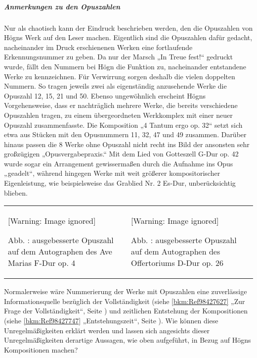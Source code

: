 \documentclass[a4paper]{article}
\newcounter{Abb}
\renewcommand\theAbb{\arabic{Abb}}
\begin{document}
\clearpage\subparagraph{Anmerkungen zu den Opuszahlen}
Nur als chaotisch kann der Eindruck beschrieben werden, den die
Opuszahlen von Högns Werk auf den Leser machen. Eigentlich sind die
Opuszahlen dafür gedacht, nacheinander im Druck erschienenen Werken
eine fortlaufende Erkennungsnummer zu geben. Da nur der Marsch „In
Treue fest!“ gedruckt wurde, fällt den Nummern bei Högn die Funktion
zu, nacheinander entstandene Werke zu kennzeichnen. Für Verwirrung
sorgen deshalb die vielen doppelten Nummern. So tragen jeweils zwei als
eigenständig anzusehende Werke die Opuszahl 12, 15, 21 und 50. Ebenso
ungewöhnlich erscheint Högns Vorgehensweise, dass er nachträglich
mehrere Werke, die bereits verschiedene Opuszahlen tragen, zu einem
übergeordneten Werkkomplex mit einer neuer Opuszahl zusammenfasste. Die
Komposition „4 Tantum ergo op. 32“ setzt sich etwa aus Stücken mit den
Opusnummern 11, 32, 47 und 49 zusammen. Darüber hinaus passen die 8
Werke ohne Opuszahl nicht recht ins Bild der ansonsten sehr großzügigen
„Opusvergabepraxis.“ Mit dem Lied von Gotteszell G-Dur op. 42 wurde
sogar ein Arrangement gewissermaßen durch die Aufnahme ins Opus
„geadelt“, während hingegen Werke mit weit größerer kompositorischer
Eigenleistung, wie beispielsweise das Grablied Nr. 2 Es-Dur,
unberücksichtig blieben.

\begin{center}
\begin{minipage}{9.241cm}
\begin{center}
\tablefirsthead{}
\tablehead{}
\tabletail{}
\tablelasttail{}
\begin{supertabular}{m{4.5470004cm}m{4.294cm}}
  [Warning: Image ignored] %
 
Abb. \stepcounter{Abb}{\theAbb}: ausgebesserte Opuszahl auf dem
Autographen des Ave Marias F-Dur op. 4 &
  [Warning: Image ignored] %
 
Abb. \stepcounter{Abb}{\theAbb}: ausgebesserte Opuszahl auf dem
Autographen des Offertoriums D-Dur op. 26\\
\end{supertabular}
\end{center}
\end{minipage}
\end{center}
Normalerweise wäre Nummerierung der Werke mit Opuszahlen eine
zuverlässige Informationsquelle bezüglich der Vollständigkeit (siehe
\ref{bkm:Ref98427627} „Zur Frage der Vollständigkeit“, Seite
\pageref{bkm:Ref98427627}) und zeitlichen Entstehung der Kompositionen
(siehe \ref{bkm:Ref98427747} „Entstehungszeit“, Seite
\pageref{bkm:Ref98427747}). Wie können diese Unregelmäßigkeiten erklärt
werden und lassen sich angesichts dieser Unregelmäßigkeiten derartige
Aussagen, wie oben aufgeführt, in Bezug auf Högns Kompositionen machen?
\end{document}
